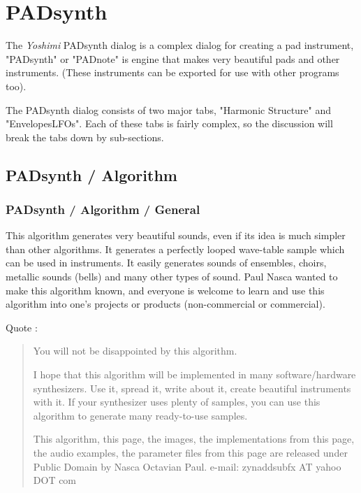 %
%
%

\section{PADsynth}
\label{sec:padsynth}

   The \textsl{Yoshimi} PADsynth dialog is a complex dialog for creating a
   pad instrument,  "PADsynth" or "PADnote" is engine that makes very
   beautiful pads and other instruments. (These instruments can be exported
   for use with other programs too).

   The PADsynth dialog consists of two major tabs, "Harmonic Structure" and
   "EnvelopesLFOs".  Each of these tabs is fairly complex, so the discussion
   will break the tabs down by sub-sections.

\subsection{PADsynth / Algorithm}
\label{subsec:padsynth_algorithm}

\subsubsection{PADsynth / Algorithm / General}
\label{subsubsec:padsynth_algorithm_general}

   This algorithm generates very beautiful sounds, even if its idea is much
   simpler than other algorithms. It generates a perfectly looped wave-table
   sample which can be used in instruments. It easily generates sounds of
   ensembles, choirs, metallic sounds (bells) and many other types of sound.
   Paul Nasca wanted to make this algorithm known, and everyone is welcome to
   learn and use this algorithm into one's projects or products (non-commercial
   or commercial).
   
   Quote \cite{zyndoc}:

   \begin{quotation}
      You will not be disappointed by this algorithm.

      I hope that this algorithm will be implemented in many software/hardware
      synthesizers. Use it, spread it, write about it, create beautiful
      instruments with it. If your synthesizer uses plenty of samples, you can
      use this algorithm to generate many ready-to-use samples.

      This algorithm, this page, the images, the implementations from this
      page, the audio examples, the parameter files from this page
      are released under Public Domain by Nasca Octavian Paul.
      e-mail: zynaddsubfx AT yahoo DOT com
   \end{quotation}

